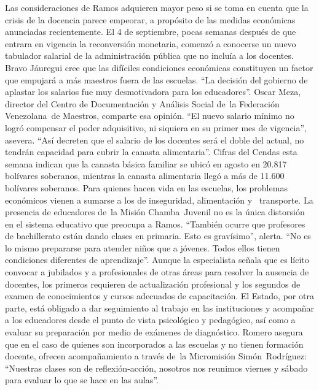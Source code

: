 \documentclass{article}%
\begin{document}
\newline%
%
Las consideraciones de Ramos adquieren mayor peso si se toma en cuenta que la crisis de la docencia parece empeorar, a propósito de las medidas económicas anunciadas recientemente. El 4 de septiembre, pocas semanas después de que entrara en vigencia la reconversión monetaria, comenzó a conocerse un nuevo tabulador salarial de la administración pública que no incluía a los docentes.%
\newline%
%
Bravo Jáuregui cree que las difíciles condiciones económicas constituyen un factor que empujará a más maestros fuera de las escuelas. “La decisión del gobierno de aplastar los salarios fue muy desmotivadora para los educadores”.%
\newline%
%
Oscar Meza, director del Centro de Documentación y Análisis Social de~la Federación Venezolana~de Maestros, comparte esa opinión. “El nuevo salario mínimo no logró compensar el poder adquisitivo, ni siquiera en su primer mes de vigencia”, asevera. “Así decreten que el salario de los docentes será el doble del actual, no tendrán capacidad para cubrir la canasta alimentaria”.%
\newline%
%
Cifras del Cendas esta semana indican que la canasta básica familiar se ubicó en agosto en 20.817 bolívares soberanos, mientras la canasta alimentaria llegó a más de 11.600 bolívares soberanos. Para quienes hacen vida en las escuelas, los problemas económicos vienen a sumarse a los de inseguridad, alimentación y ~transporte.%
\newline%
%
La presencia de educadores de~la Misión Chamba~Juvenil no es la única distorsión en el sistema educativo que preocupa a Ramos. “También ocurre que profesores de bachillerato están dando clases en primaria. Esto es gravísimo”, alerta. “No es lo mismo prepararse para atender niños que a jóvenes. Todos ellos tienen condiciones diferentes de aprendizaje”. Aunque la especialista señala que es lícito convocar a jubilados y a profesionales de otras áreas para resolver la ausencia de docentes, los primeros requieren de actualización profesional y los segundos de examen de conocimientos y cursos adecuados de capacitación.%
\newline%
%
El Estado, por otra parte, está obligado a dar seguimiento al trabajo en las instituciones y acompañar a los educadores desde el punto de vista psicológico y pedagógico, así como a evaluar su preparación por medio de exámenes de diagnóstico.%
\newline%
%
Romero asegura que en el caso de quienes son incorporados a las escuelas y no tienen formación docente, ofrecen acompañamiento a través de~la Micromisión Simón~Rodríguez: “Nuestras clases son de reflexión{-}acción, nosotros nos reunimos viernes y sábado para evaluar lo que se hace en las aulas”.%
\end{document}

